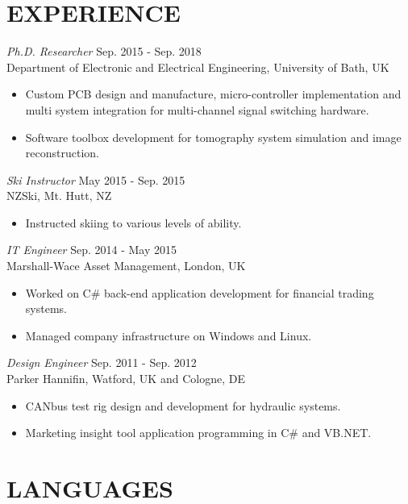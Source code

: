 \documentclass[margin, 10pt]{res} %
\begin{document}
\begin{resume}
\section{EXPERIENCE}

{\sl Ph.D. Researcher} \hfill Sep. 2015 - Sep. 2018 \\
Department of Electronic and Electrical Engineering, University of Bath, UK
\begin{itemize} 
\item Custom PCB design and manufacture, micro-controller implementation and multi system integration for multi-channel signal switching hardware.
\item Software toolbox development for tomography system simulation and image reconstruction.
\end{itemize}

{\sl Ski Instructor} \hfill May 2015 - Sep. 2015 \\
NZSki, Mt. Hutt, NZ
\begin{itemize} 
\item Instructed skiing to various levels of ability.
\end{itemize}

{\sl IT Engineer} \hfill Sep. 2014 - May 2015 \\
Marshall-Wace Asset Management, London, UK 
\begin{itemize} 
\item Worked on C\# back-end application development for financial trading systems.
\item Managed company infrastructure on Windows and Linux.
\end{itemize} 

{\sl Design Engineer} \hfill Sep. 2011 - Sep. 2012 \\
Parker Hannifin, Watford, UK and Cologne, DE
\begin{itemize}
\item CANbus test rig design and development for hydraulic systems.
\item Marketing insight tool application programming in C\# and VB.NET.
\end{itemize} 


\section{LANGUAGES}


\end{resume}
\end{document}
